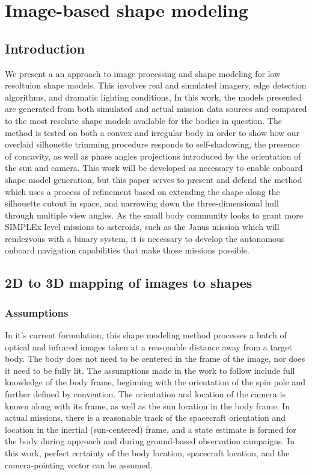 \chapter{Image-based shape modeling}
\label{shape_modeling}
\section{Introduction}
We present a an approach to image processing and shape modeling for low resoltuion shape models. This involves real and simulated imagery, edge detection algorithms, and dramatic lighting conditions, 
In this work, the models presented are generated from both simulated and actual mission data sources and compared to the most resolute shape models available for the bodies in question. The method is tested on both a convex and irregular body in order to show how our overlaid silhouette trimming procedure responds to self-shadowing, the presence of concavity, as well as phase angles  projections introduced by the orientation of the sun and camera. This work will be developed as necessary to enable onboard shape model generation, but this paper serves to present and defend the method which uses a process of refinement based on extending the shape along the silhouette cutout in space, and narrowing down the three-dimensional hull through multiple view angles. As the small body community looks to grant more SIMPLEx level missions to asteroids, such as the Janus mission which will rendezvous with a binary system, it is necessary to develop the autonomous onboard navigation capabilities that make those missions possible. 

\section{2D to 3D mapping of images to shapes}
\subsection{Assumptions} 
In it's current formulation, this shape modeling method processes a batch of optical and infrared images taken at a reasonable distance away from a target body. The body does not need to be centered in the frame of the image, nor does it need to be fully lit. The assumptions made in the work to follow include full knowledge of the body frame, beginning with the orientation of the spin pole and further defined by convention. The orientation and location of the camera is known along with its frame, as well as the sun location in the body frame. In actual missions, there is a reasonable track of the spacecraft orientation and location in the inertial (sun-centered) frame, and a state estimate is formed for the body during approach and during ground-based observation campaigns. In this work, perfect certainty of the body location, spacecraft location, and the camera-pointing vector can be assumed.    

